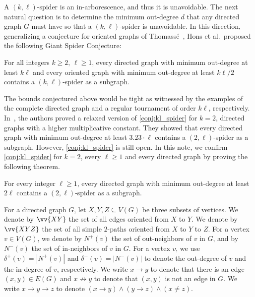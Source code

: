 \documentclass[a4paper,USenglish,cleveref,autoref,thm-restate,pdfa]{lipics-v2021}
\let\ge\geqslant
\newcommand{\norm}[1]{{\left|#1\right|}}
\newcommand{\noto}{\not\to}
\newcommand{\pathset}[1]{\vv{#1}}
\begin{document}
A $(k,\ell)$\nobreakdash-spider is an in-arborescence, and thus it is unavoidable. The next natural question is to determine the minimum out-degree $d$ that any directed graph $G$ must have so that a $(k,\ell)$\nobreakdash-spider is unavoidable. In this direction, generalizing a conjecture for oriented graphs of Thomassé~\cite{bang2008digraphs,sullivan2006summary}, Hons et al.\ proposed the following Giant Spider Conjecture:
 
\begin{conjecture}\label{conj:kl_spider}
    For all integers $k \ge 2$, $\ell \ge 1$, every directed graph with minimum out-degree at least $k\ell$ and every oriented graph with minimum out-degree at least $k\ell / 2$ contains a $(k,\ell)$\nobreakdash-spider as a subgraph.
\end{conjecture}

The bounds conjectured above would be tight as witnessed by the examples of the complete directed graph and a regular tournament of order $k\ell$, respectively. 
In~\cite{hons2025unavoidable}, the authors proved a relaxed version of \cref{conj:kl_spider} for $k=2$, directed graphs with a higher multiplicative constant.
They showed that every directed graph with minimum out-degree at least $3.23\cdot\ell$ contains a $(2,\ell)$\nobreakdash-spider as a subgraph.
However, \cref{conj:kl_spider} is still open.
In this note, we confirm \cref{conj:kl_spider} for $k=2$, every $\ell \ge 1$ and every directed graph by proving the following theorem.
\begin{theorem}\label{thm:main}
    For every integer $\ell \ge 1$, every directed graph with minimum out-degree at least $2\ell$ contains a $(2, \ell)$\nobreakdash-spider as a subgraph.
\end{theorem}

For a directed graph $G$, let $X,Y,Z \subseteq V(G)$ be three subsets of vertices.
We denote by $\pathset{XY}$ the set of all edges oriented from $X$ to $Y$.
We denote by $\pathset{XYZ}$ the set of all simple $2$-paths oriented from $X$ to $Y$ to $Z$.
For a vertex $v \in V(G)$, we denote by $N^+(v)$ the set of out-neighbors of $v$ in $G$, and by $N^-(v)$ the set of in-neighbors of $v$ in $G$.
For a vertex $v$, we use $\delta^+(v) = \norm{N^+(v)}$ and $\delta^-(v) = \norm{N^-(v)}$ to denote the out-degree of $v$ and the in-degree of $v$, respectively. 
We write $x \to y$ to denote that there is an edge $(x,y) \in E(G)$ and $x \noto y$ to denote that $(x,y)$ is not an edge in $G$.
We write $x \to y \to z$ to denote $(x \to y) \land (y \to z) \land (x \neq z)$.
\end{document}
